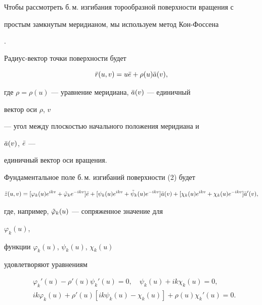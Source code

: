 Чтобы рассмотреть б.\,м. изгибания торообразной поверхности вращения с


простым замкнутым меридианом, мы используем метод Кон-Фоссена


\cite{Kohn}.





Радиус-вектор точки поверхности будет


\begin{equation}


\Bar r(u,v)=u\Bar e+\rho(u)\Bar a(v),


\end{equation}


где $\rho=\rho(u)$ --- уравнение меридиана, $\Bar a(v)$ --- единичный


вектор оси $\rho$, $v$


--- угол между плоскостью начального положения меридиана и


$\Bar a(v)$, $\Bar e$ ---


единичный вектор оси вращения.





Фундаментальное поле б.\,м. изгибаний поверхности (2) будет


\begin{equation}


\Bar z(u,v)=[\varphi_k(u)e^{ikv}+\Tilde\varphi_ke^{-ikv}]\Bar e


+[\psi_k(u)e^{ikv}+\Tilde\psi_k(u)e^{-ikv}]\Bar a(v)+


[\chi_k(u)e^{ikv}+\chi_k(u)e^{-ikv}]\Bar a'(v),


\end{equation}


где, например, $\Tilde\varphi_k(u)$ --- сопряженное значение для


$\varphi_k(u)$,


функции $\varphi_k(u)$, $\psi_k(u)$, $\chi_k(u)$


удовлетворяют уравнениям


\begin{equation}


\begin{split}


&\varphi_k'(u)-\rho'(u)\psi_k'(u)=0,\quad


\psi_k(u)+ik\chi_k(u)=0,\\


&ik\varphi_k(u)+\rho'(u)[ik\psi_k(u)-\chi_k(u)]+


\rho(u)\chi_k'(u)=0.


\end{split}


\end{equation}


